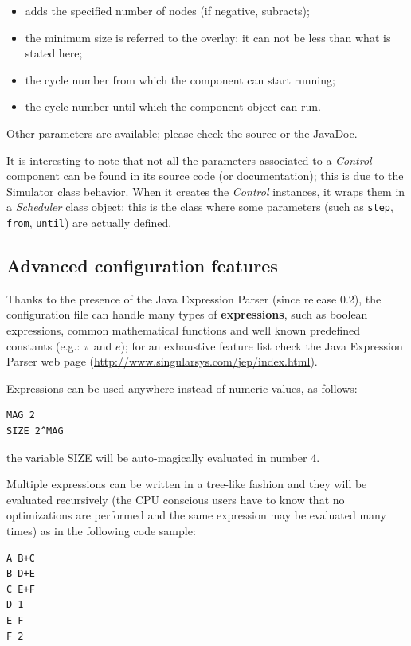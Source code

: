 \documentclass[a4paper,11pt]{article}
\begin{document}
\begin{itemize}
\item adds the specified number of nodes (if negative, subracts);
\item the minimum size is referred to the overlay: it can not be less than
what is stated here;
\item the cycle number from which the component can start running;
\item the cycle number until which the component object can run.
\end{itemize}

Other parameters are available; please check the source or the JavaDoc.

It is interesting to note that not all the parameters associated to
a \emph{Control} component can be found in its source code (or
documentation); this is due to the Simulator class 
behavior. When it creates the \emph{Control} instances, it
wraps them in a \emph{Scheduler} class object: this is the class where
some parameters (such as \texttt{step}, \texttt{from}, \texttt{until})
are actually defined.

\subsection{Advanced configuration features}

Thanks to the presence of the Java Expression Parser (since release
0.2), the configuration
file can handle many types of \textbf{expressions}, such as boolean 
expressions, common mathematical functions and well known predefined
constants (e.g.: $\pi$ and $e$); for an exhaustive feature list check
the Java Expression Parser web page
(\url{http://www.singularsys.com/jep/index.html}).

Expressions can be used anywhere instead of numeric values, as follows:

\begin{verbatim}
MAG 2
SIZE 2^MAG
\end{verbatim}

the variable SIZE will be auto-magically evaluated in number 4.

Multiple expressions can be written in a tree-like fashion and they will
be evaluated recursively (the CPU conscious users have to know that 
no optimizations are performed and the same expression may be evaluated
many times) as in the following code sample:

\begin{verbatim}
A B+C
B D+E
C E+F
D 1
E F
F 2
\end{verbatim}
\end{document}
